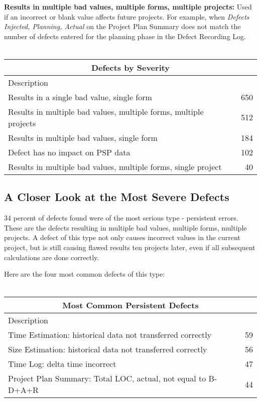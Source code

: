 {\bf Results in multiple bad values, multiple forms, multiple projects:} 
Used
if an incorrect or blank value affects future projects.  For example, 
when
{\it Defects Injected, Planning, Actual} on the Project Plan Summary 
does
not match the number of defects entered for the planning phase in the
Defect Recording Log.\\ \\

\begin{tabular}{|l|r|}\hline
\multicolumn{2}{|c|}{\bf Defects by Severity}\\ \hline
Description & \\ \hline\hline
Results in a single bad value, single form   & 650 \\ \hline
Results in multiple bad values, multiple forms, multiple projects  & 512
\\ \hline
Results in multiple bad values, single form  & 184 \\ \hline
Defect has no impact on PSP data             & 102 \\ \hline
Results in multiple bad values, multiple forms, single project  & 40 \\ 
\hline

\end{tabular}

\subsection{A Closer Look at the Most Severe Defects}
34 percent of defects found were of the most serious type - persistent
errors.  These are the defects resulting in multiple bad values,
multiple forms, multiple projects.  A defect of this type not only 
causes
incorrect values in the current project, but is still causing flawed 
results
ten projects later, even if all subsequent calculations are done 
correctly.

Here are the four most common defects of this type:\\ \\
\begin{tabular}{|l|r|}\hline
\multicolumn{2}{|c|}{\bf Most Common Persistent Defects}\\ \hline
Description & \\ \hline\hline
Time Estimation: historical data not transferred correctly     & 59 \\ 
\hline
Size Estimation: historical data not transferred correctly     & 56 \\ 
\hline
Time Log: delta time incorrect                                 & 47 \\ 
\hline
Project Plan Summary: Total LOC, actual, not equal to B-D+A+R  & 44 \\ 
\hline

\end{tabular}


